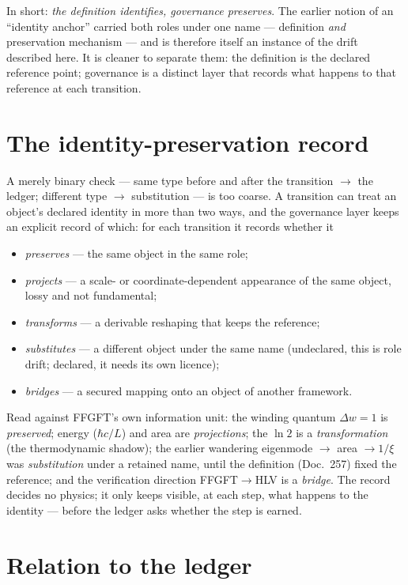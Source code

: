 In short: \emph{the definition identifies, governance preserves}. The earlier notion of an
\enquote{identity anchor} carried both roles under one name --- definition \emph{and}
preservation mechanism --- and is therefore itself an instance of the drift described
here. It is cleaner to separate them: the definition is the declared reference point;
governance is a distinct layer that records what happens to that reference at each
transition.

\section{The identity-preservation record}

A merely binary check --- same type before and after the transition $\to$ the ledger;
different type $\to$ substitution --- is too coarse. A transition can treat an object's
declared identity in more than two ways, and the governance layer keeps an explicit record
of which: for each transition it records whether it

\begin{itemize}
\item \emph{preserves} --- the same object in the same role;
\item \emph{projects} --- a scale- or coordinate-dependent appearance of the same object,
lossy and not fundamental;
\item \emph{transforms} --- a derivable reshaping that keeps the reference;
\item \emph{substitutes} --- a different object under the same name (undeclared, this is
role drift; declared, it needs its own licence);
\item \emph{bridges} --- a secured mapping onto an object of another framework.
\end{itemize}

Read against FFGFT's own information unit: the winding quantum $\Delta w = 1$ is
\emph{preserved}; energy ($\hbar c/L$) and area are \emph{projections}; the $\ln 2$ is a
\emph{transformation} (the thermodynamic shadow); the earlier wandering eigenmode $\to$
area $\to 1/\xi$ was \emph{substitution} under a retained name, until the definition
(Doc.~257) fixed the reference; and the verification direction FFGFT$\to$HLV is a
\emph{bridge}. The record decides no physics; it only keeps visible, at each step, what
happens to the identity --- before the ledger asks whether the step is earned.

\section{Relation to the ledger}

